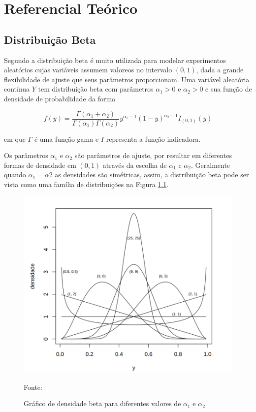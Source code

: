 \chapter{Referencial Teórico}


\section{Distribuição Beta}

Segundo \cite{gomes2005} a distribuição beta é muito utilizada para modelar experimentos aleatórios cujas variáveis assumem valoreos no intervalo $(0,1)$, dada a grande flexibilidade de ajuste que seus parâmetros proporcionam. Uma variável aleatória contínua $Y$ tem distribuição beta com parâmetros $\alpha_1 > 0$ e $\alpha_2 > 0$ e sua função de densidade de probabilidade da forma

\begin{equation}
f(y)=\frac {\Gamma(\alpha_1+\alpha_2)}{\Gamma(\alpha_1)\Gamma(\alpha_2)} y^{\alpha_1-1}(1-y)^{\alpha_2-1}I_{(0,1)}(y)
\end{equation}

em que $\Gamma$ é uma função gama e $I$ representa a função indicadora.

Os parâmetros $\alpha_1$ e $\alpha_2$ são parâmetros de ajuste, por resultar em diferentes formas de densidade em $(0,1)$ através da escolha de $\alpha_1$ e $\alpha_2$. Geralmente quando $\alpha_1 = \alpha2$ as densidades são simétricas, assim, a distribuição beta pode ser vista como uma família de distribuições na Figura \ref{fig06}.


\begin{figure}[!h]
	\centering
	\includegraphics[keepaspectratio=true,scale=0.3]{figuras/dist-beta1.png}
	\caption{Gráfico de densidade beta para diferentes valores de $\alpha_1$ e $\alpha_2$}
	Fonte: \cite{gomes2005}
	\label{fig06}
\end{figure}


